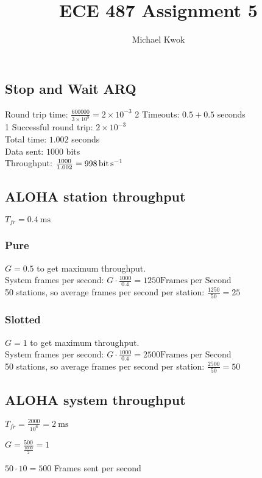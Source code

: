 \documentclass{article}
\title{ECE 487 Assignment 5}
\author{Michael Kwok}
\begin{document}
\maketitle
\subsection*{Stop and Wait ARQ}
Round trip time: \(\frac{600000}{3 \times 10^8} = 2 \times 10^{-3}\)
2 Timeouts: \(0.5 + 0.5\) seconds\\
1 Successful round trip: \(2 \times 10^{-3}\) \\
Total time: \(1.002\) seconds\\
Data sent: \(1000\) bits\\
Throughput: \( \frac{1000}{1.002} = \SI{998}{\bit\per\second}\)

\subsection*{ALOHA station throughput}
\(T_{fr} = \SI{0.4}{\milli\second}\)

\subsubsection*{Pure}
\(G = 0.5\) to get maximum throughput.\\
System frames per second: \( G \cdot \frac{1000}{0.4} = 1250 \text{Frames per Second} \) \\
50 stations, so average frames per second per station: \(\frac{1250}{50} = 25\)

\subsubsection*{Slotted}
\(G = 1\) to get maximum throughput.\\
System frames per second: \( G \cdot \frac{1000}{0.4} = 2500 \text{Frames per Second} \) \\
50 stations, so average frames per second per station: \(\frac{2500}{50} = 50\)

\subsection*{ALOHA system throughput}
\(T_{fr} = \frac{2000}{10^6} = \SI{2}{\milli\second}\)

\(G = \frac{500}{\frac{1000}{2}} = 1\)

\(50 \cdot 10 = 500\) Frames sent per second
\end{document}

